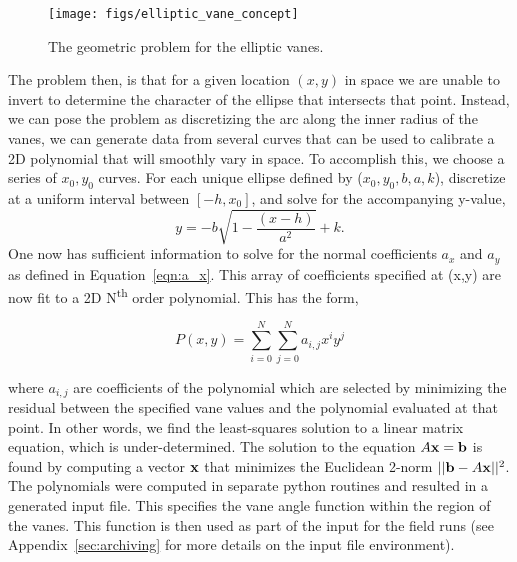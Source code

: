  \begin{figure}[!htb]
  \begin{center}
   \texttt{[image: figs/elliptic\_vane\_concept]}
   \caption{The geometric problem for the elliptic vanes.}
   \label{fig:elliptic_vane_concept}
  \end{center}
 \end{figure}

The problem then, is that for a given location $(x,y)$ in space we are
unable to invert to determine the character of the ellipse that
intersects that point. Instead, we can pose the problem as discretizing
the arc along the inner radius of the vanes, we can generate data from
several curves that can be used to calibrate a 2D polynomial that will
smoothly vary in space. To accomplish this, we choose a series of
$x_0,y_0$ curves. For each unique ellipse defined by ($x_0,y_0,b,a,k$),
discretize at a uniform interval between $\left[-h,x_0\right]$, and
solve for the accompanying y-value, 
\begin{equation}
 y = -b \sqrt{1-\frac{(x-h)}{a^2}} + k. 
\end{equation}
One now has sufficient information to solve for the normal coefficients
$a_x$ and $a_y$ as defined in Equation~\ref{eqn:a_x}. This array of
coefficients specified at (x,y) are now fit to a 2D N\textsuperscript{th}
order polynomial. This has the form, 

\begin{equation}
 P(x,y) = \sum_{i=0}^N  \sum_{j=0}^N a_{i,j} x^i y^j
\end{equation}

where $a_{i,j}$ are coefficients of the polynomial which are selected by
minimizing the residual between the specified vane values and the
polynomial evaluated at that point. In other words, we find the
least-squares solution to a linear matrix equation, which is
under-determined. The solution to the equation $A {\bf x} = {\bf b}$ is
found by computing a vector ${\bf x}$ that minimizes the Euclidean
2-norm $|| {\bf b} - A {\bf x} ||^2$. The polynomials were computed in
separate python routines and 
resulted in a generated input file. This specifies the vane angle
function within the region of the vanes. This function is then used as
part of the input for the field runs (see Appendix~\ref{sec:archiving}
for more details on the input file environment). 
%
%


